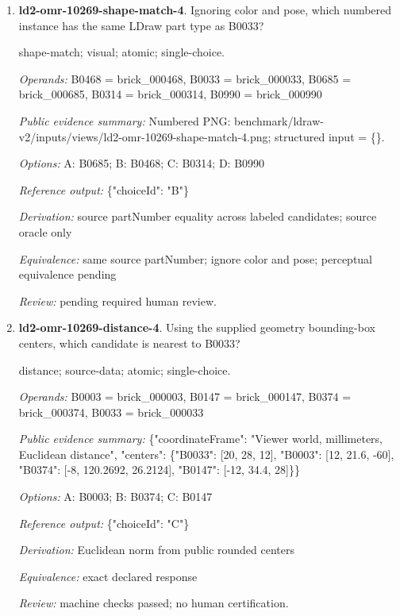 \begin{enumerate}
\par{\small color; visual; atomic; single-choice.\par\textit{Operands:} B0033 = brick\_000033\par\textit{Public evidence summary:} Numbered PNG: benchmark/ldraw-v2/inputs/views/ld2-omr-10269-color-4.png; structured input = \{\}.\par\textit{Options:} A: Dark Bluish Grey; B: Red; C: Light Bluish Grey; D: Trans Orange\par\textit{Reference output:} \{"choiceId": "C"\}\par\textit{Derivation:} source colorName by rendered B-label; source oracle only\par\textit{Equivalence:} exact declared response\par\textit{Review:} pending required human review.}
\item \textbf{ld2-omr-10269-shape-match-4}. Ignoring color and pose, which numbered instance has the same LDraw part type as B0033?
\par{\small shape-match; visual; atomic; single-choice.\par\textit{Operands:} B0468 = brick\_000468, B0033 = brick\_000033, B0685 = brick\_000685, B0314 = brick\_000314, B0990 = brick\_000990\par\textit{Public evidence summary:} Numbered PNG: benchmark/ldraw-v2/inputs/views/ld2-omr-10269-shape-match-4.png; structured input = \{\}.\par\textit{Options:} A: B0685; B: B0468; C: B0314; D: B0990\par\textit{Reference output:} \{"choiceId": "B"\}\par\textit{Derivation:} source partNumber equality across labeled candidates; source oracle only\par\textit{Equivalence:} same source partNumber; ignore color and pose; perceptual equivalence pending\par\textit{Review:} pending required human review.}
\item \textbf{ld2-omr-10269-distance-4}. Using the supplied geometry bounding-box centers, which candidate is nearest to B0033?
\par{\small distance; source-data; atomic; single-choice.\par\textit{Operands:} B0003 = brick\_000003, B0147 = brick\_000147, B0374 = brick\_000374, B0033 = brick\_000033\par\textit{Public evidence summary:} \{"coordinateFrame": "Viewer world, millimeters, Euclidean distance", "centers": \{"B0033": [20, 28, 12], "B0003": [12, 21.6, -60], "B0374": [-8, 120.2692, 26.2124], "B0147": [-12, 34.4, 28]\}\}\par\textit{Options:} A: B0003; B: B0374; C: B0147\par\textit{Reference output:} \{"choiceId": "C"\}\par\textit{Derivation:} Euclidean norm from public rounded centers\par\textit{Equivalence:} exact declared response\par\textit{Review:} machine checks passed; no human certification.}

\end{enumerate}
